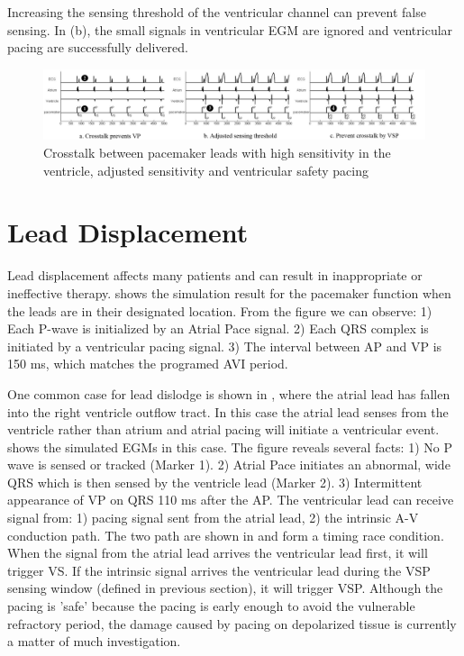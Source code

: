 Increasing the sensing threshold of the ventricular channel can prevent false sensing. In (b), the small signals in ventricular EGM are ignored and ventricular pacing are successfully delivered. 
\begin{figure}[!t]
\center
\vspace{-10pt}
		\includegraphics[width=\textwidth]{figs/crosstalk_all.pdf}
\vspace{-20pt}
\caption{Crosstalk between pacemaker leads with high sensitivity in the ventricle, adjusted sensitivity and ventricular safety pacing}
\label{fig:crosstalk}
\vspace{-15pt}
\end{figure}
\section{Lead Displacement}
Lead displacement affects many patients and can result in inappropriate or ineffective therapy.  shows the simulation result for the pacemaker function when the leads are in their designated location. From the figure we can observe: 1) Each P-wave is initialized by an Atrial Pace signal. 2) Each QRS complex is initiated by a ventricular pacing signal. 3) The interval between AP and VP is 150 ms, which matches the programed AVI period.

One common case for lead dislodge is shown in , where the atrial lead has fallen into the right ventricle outflow tract. In this case the atrial lead senses from the ventricle rather than atrium and atrial pacing will initiate a ventricular event.  shows the simulated EGMs in this case. The figure reveals several facts: 1) No P wave is sensed or tracked (Marker 1). 2) Atrial Pace initiates an abnormal, wide QRS which is then sensed by the ventricle lead (Marker 2). 3) Intermittent appearance of VP on QRS 110 ms after the AP. The ventricular lead can receive signal from: 1) pacing signal sent from the atrial lead, 2) the intrinsic A-V conduction path. The two path are shown in  and form a timing race condition. When the signal from the atrial lead arrives the ventricular lead first, it will trigger VS. If the intrinsic signal arrives the ventricular lead during the VSP sensing window (defined in previous section), it will trigger VSP. Although the pacing is 'safe' because the pacing is early enough to avoid the vulnerable refractory period, the damage caused by pacing on depolarized tissue is currently a matter of much investigation.     


